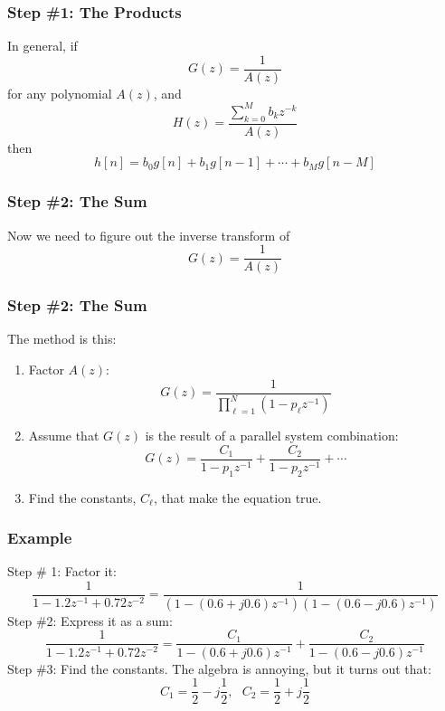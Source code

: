 \documentclass{beamer}
\begin{document}
\begin{frame}
  \frametitle{Step \#1: The Products}

  In general, if 
  \begin{displaymath}
    G(z) = \frac{1}{A(z)}
  \end{displaymath}
  for any polynomial $A(z)$, and
  \begin{displaymath}
    H(z) = \frac{\sum_{k=0}^M b_kz^{-k}}{A(z)}
  \end{displaymath}
  then
  \begin{displaymath}
    h[n] = b_0 g[n]+b_1g[n-1]+\cdots+b_M g[n-M]
  \end{displaymath}
\end{frame}

\begin{frame}
  \frametitle{Step \#2: The Sum}

  Now we need to figure out the inverse transform of
  \begin{displaymath}
    G(z) = \frac{1}{A(z)}
  \end{displaymath}
\end{frame}

\begin{frame}
  \frametitle{Step \#2: The Sum}
  The method is this:
  \begin{enumerate}
  \item Factor $A(z)$:
    \begin{displaymath}
      G(z) = \frac{1}{\prod_{\ell=1}^N \left(1-p_\ell z^{-1}\right)}
    \end{displaymath}
  \item Assume that $G(z)$ is the result of a parallel system
    combination:
    \begin{displaymath}
      G(z) = \frac{C_1}{1-p_1z^{-1}} + \frac{C_2}{1-p_2z^{-1}} + \cdots
    \end{displaymath}
  \item Find the constants, $C_\ell$, that make the equation true.
  \end{enumerate}
\end{frame}

\begin{frame}
  \frametitle{Example}
  Step \# 1:  Factor it:
  \begin{displaymath}
    \frac{1}{1-1.2z^{-1}+0.72z^{-2}}=
    \frac{1}{\left(1-(0.6+j0.6)z^{-1}\right)\left(1-(0.6-j0.6)z^{-1}\right)}
  \end{displaymath}
  Step \#2: Express it as a  sum:
  \begin{displaymath}
    \frac{1}{1-1.2z^{-1}+0.72z^{-2}}=
    \frac{C_1}{1-(0.6+j0.6)z^{-1}}+\frac{C_2}{1-(0.6-j0.6)z^{-1}}
  \end{displaymath}
  Step \#3: Find the constants.  The algebra is annoying, but it turns out that:
  \begin{displaymath}
    C_1=\frac{1}{2}-j\frac{1}{2},~~~
    C_2=\frac{1}{2}+j\frac{1}{2}
  \end{displaymath}
\end{frame}
\end{document}
